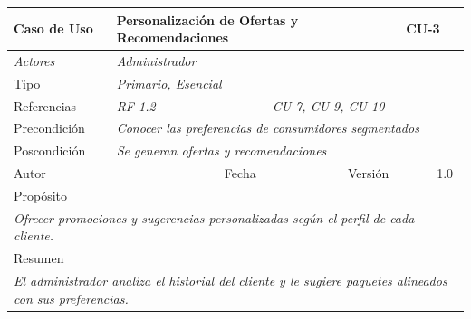 \begin{table}[H]
\begin{tabular}{|llllllll|}
\hline
\multicolumn{1}{|l|}{\cellcolor[HTML]{F2F2F2}Caso de Uso} & \multicolumn{5}{l|}{Personalización de Ofertas y Recomendaciones} & \multicolumn{2}{l|}{\cellcolor[HTML]{E6E6E6}CU-3} \\ \hline
\multicolumn{1}{|l|}{{\color[HTML]{808080} \textit{Actores}}} & \multicolumn{7}{l|}{{\color[HTML]{808080} \textit{Administrador}}} \\ \hline
\multicolumn{1}{|l|}{Tipo} & \multicolumn{7}{l|}{{\color[HTML]{808080} \textit{Primario, Esencial}}} \\ \hline
\multicolumn{1}{|l|}{Referencias} & \multicolumn{2}{l|}{{\color[HTML]{808080} \textit{RF-1.2}}} & \multicolumn{5}{l|}{{\color[HTML]{808080} \textit{CU-7, CU-9, CU-10}}} \\ \hline
\multicolumn{1}{|l|}{Precondición} & \multicolumn{7}{l|}{{\color[HTML]{808080} \textit{Conocer las preferencias de consumidores segmentados}}} \\ \hline
\multicolumn{1}{|l|}{Poscondición} & \multicolumn{7}{l|}{{\color[HTML]{808080} \textit{Se generan ofertas y recomendaciones}}} \\ \hline
\multicolumn{1}{|l|}{Autor} & \multicolumn{1}{l|}{} & \multicolumn{2}{l|}{Fecha} & \multicolumn{1}{l|}{} & \multicolumn{2}{l|}{Versión} & 1.0 \\ \hline
\multicolumn{8}{|l|}{Propósito} \\ \hline
\multicolumn{8}{|p{15cm}|}{{\color[HTML]{808080} \textit{Ofrecer promociones y sugerencias personalizadas según el perfil de cada cliente.}}} \\ \hline
\multicolumn{8}{|l|}{Resumen} \\ \hline
\multicolumn{8}{|p{15cm}|}{{\color[HTML]{808080} \textit{El administrador analiza el historial del cliente y le sugiere paquetes alineados con sus preferencias.}}} \\ \hline
\end{tabular}
\end{table}

